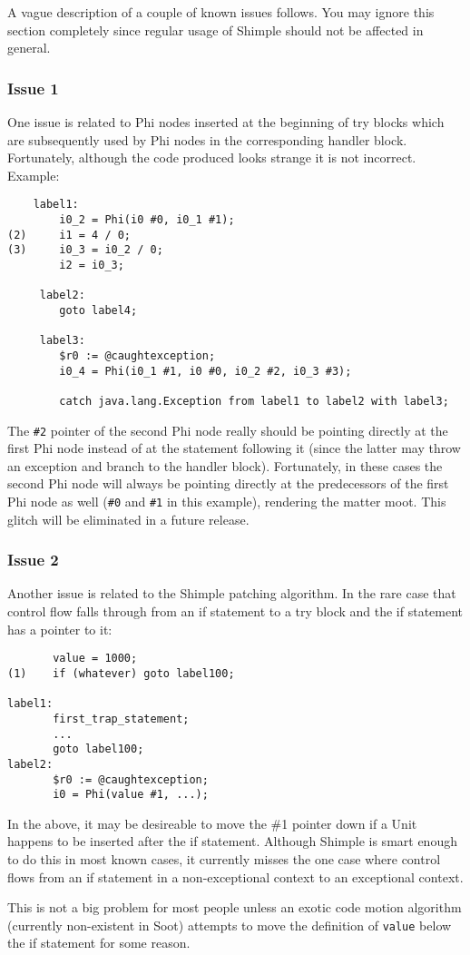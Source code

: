 \documentclass[10pt,letterpaper,oneside,onecolumn]{article}
\begin{document}
A vague description of a couple of known issues follows.  You may
ignore this section completely since regular usage of Shimple should
not be affected in general.

\subsubsection{Issue 1}

One issue is related to Phi nodes inserted at the beginning of try
blocks which are subsequently used by Phi nodes in the corresponding
handler block.  Fortunately, although the code produced looks strange
it is not incorrect.  Example:

\begin{verbatim}
    label1:
        i0_2 = Phi(i0 #0, i0_1 #1);
(2)     i1 = 4 / 0;
(3)     i0_3 = i0_2 / 0;
        i2 = i0_3;

     label2:
        goto label4;

     label3:
        $r0 := @caughtexception;
        i0_4 = Phi(i0_1 #1, i0 #0, i0_2 #2, i0_3 #3);

        catch java.lang.Exception from label1 to label2 with label3;
\end{verbatim}

The {\tt \#2} pointer of the second Phi node really should be pointing
directly at the first Phi node instead of at the statement following
it (since the latter may throw an exception and branch to the handler
block).  Fortunately, in these cases the second Phi node will always
be pointing directly at the predecessors of the first Phi node as well
({\tt \#0} and {\tt \#1} in this example), rendering the matter moot.
This glitch will be eliminated in a future release.

\subsubsection{Issue 2}

Another issue is related to the Shimple patching algorithm.  In the
rare case that control flow falls through from an if statement to a
try block and the if statement has a pointer to it:

\begin{verbatim}
       value = 1000;
(1)    if (whatever) goto label100;

label1:
       first_trap_statement;
       ...
       goto label100;
label2:
       $r0 := @caughtexception;
       i0 = Phi(value #1, ...);
\end{verbatim}

In the above, it may be desireable to move the \#1 pointer down if a
Unit happens to be inserted after the if statement.  Although Shimple
is smart enough to do this in most known cases, it currently misses
the one case where control flows from an if statement in a
non-exceptional context to an exceptional context.

This is not a big problem for most people unless an exotic code motion
algorithm (currently non-existent in Soot) attempts to move the
definition of {\tt value} below the if statement for some reason.
\end{document}
